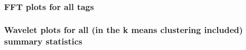\documentclass[
  authoryear,
  review,
  3p]{elsarticle}
\begin{document}
\hypertarget{fft-plots-for-all-tags}{%
\subsubsection{FFT plots for all tags}\label{fft-plots-for-all-tags}}

\hypertarget{wavelet-plots-for-all-in-the-k-means-clustering-included-summary-statistics}{%
\subsubsection{Wavelet plots for all (in the k means clustering
included) summary
statistics}\label{wavelet-plots-for-all-in-the-k-means-clustering-included-summary-statistics}}


  
\end{document}
